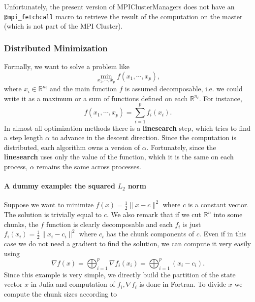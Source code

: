 \documentclass[11pt]{article}
\begin{document}
Unfortunately, the present version of MPIClusterManagers does not have
an \texttt{@mpi\_fetchcall} macro to retrieve the result of the
computation on the master (which is not part of the MPI Cluster).

\hypertarget{distributed-minimization}{%
\subsubsection{Distributed
Minimization}\label{distributed-minimization}}

Formally, we want to solve a problem like
\[ \min_{x_1,\cdots,x_p} f(x_1,\cdots,x_p), \] 
where $x_i \in \mathbb{R}^{n_i}$ and the main function \(f\) is assumed decomposable, i.e. we 
could write it as a maximum or a sum of functions defined on each \(\mathbb{R}^{n_i}\). For
instance, \[ f(x_1,\cdots,x_p) = \sum_{i=1}^p f_i(x_i).\] In almost all
optimization methods there is a \textbf{linesearch} step, which tries to
find a step length \(\alpha\) to advance in the descent direction.
Since the computation is distributed, each algorithm owns a version of $\alpha$.
Fortunately, since the \textbf{linesearch} uses only
the value of the function, which it is the same on each process,
\(\alpha\) remains the same across processes.

\hypertarget{a-dummy-example-the-squared-l_2-norm}{%
\paragraph{\texorpdfstring{A dummy example: the squared \(L_2\)
norm}{A dummy example: the squared L\_2 norm}}\label{a-dummy-example-the-squared-l_2-norm}}

Suppose we want to minimize \(f(x) = \frac{1}{2}\|x-c\|^2\) where \(c\)
is a constant vector. The solution is trivially equal to \(c\). We also
remark that if we cut \(\mathbb{R}^n\) into some chunks, the \(f\)
function is clearly decomposable and each \(f_i\) is just
\(f_i(x_i) = \frac{1}{2}\|x_i - c_i\|^2\) where \(c_i\) has the chunk
components of \(c\). Even if in this case we do not need a gradient to
find the solution, we can compute it very easily using
\[\nabla f(x) = \bigoplus_{i=1}^p \nabla f_i(x_i) = \bigoplus_{i=1}^p (x_i - c_i).\]
Since this example is very simple, we directly build the partition of
the state vector \(x\) in Julia and computation of \(f_i,\nabla f_i\) is done in
Fortran. To divide \(x\) we compute the chunk sizes according to
\end{document}
